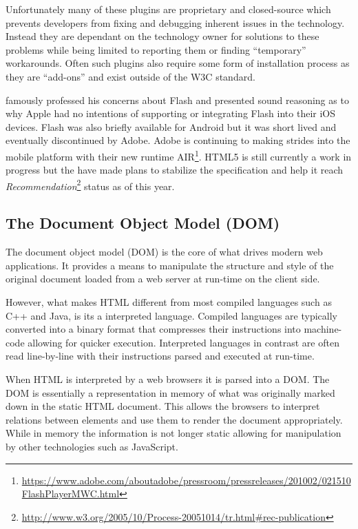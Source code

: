 \documentclass[final]{cmpreport}
\begin{document}
Unfortunately many of these plugins are proprietary and closed-source which prevents developers from fixing and debugging inherent issues in the technology. Instead they are dependant on the technology owner for solutions to these problems while being limited to reporting them or finding ``temporary'' workarounds. Often such plugins also require some form of installation process as they are ``add-ons'' and exist outside of the W3C standard. 

\citet{SJobs} famously professed his concerns about Flash and presented sound reasoning as to why Apple had no intentions of supporting or integrating Flash into their iOS devices. Flash was also briefly available for Android but it was short lived and eventually discontinued by Adobe. Adobe is continuing to making strides into the mobile platform with their new runtime AIR\footnote{\url{https://www.adobe.com/aboutadobe/pressroom/pressreleases/201002/021510FlashPlayerMWC.html}}. HTML5 is still currently a work in progress but the \citet{W3C} have made plans to stabilize the specification and help it reach \textit{Recommendation}\footnote{\url{http://www.w3.org/2005/10/Process-20051014/tr.html\#rec-publication}} status as of this year.

\subsection{The Document Object Model (DOM)}
The document object model (DOM) is the core of what drives modern web applications. It provides a means to manipulate the structure and style of the original document loaded from a web server at run-time on the client side.

However, what makes HTML different from most compiled languages such as C++ and Java, is its a interpreted language. Compiled languages are typically converted into a binary format that compresses their instructions into machine-code allowing for quicker execution. Interpreted languages in contrast are often read line-by-line with their instructions parsed and executed at run-time.

When HTML is interpreted by a web browsers it is parsed into a DOM. The DOM is essentially a representation in memory of what was originally marked down in the static HTML document. This allows the browsers to interpret relations between elements and use them to render the document appropriately. While in memory the information is not longer static allowing for manipulation by other technologies such as JavaScript.
\end{document}
